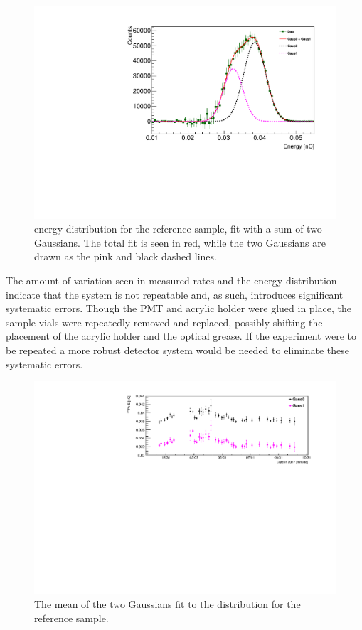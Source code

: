 \begin{figure}[!b]
	\centering
	\includegraphics[width=0.6\linewidth]{tex/6-ac227-images/BNL/PoEnFit_TimeBin23_S2}
	\caption[\Po energy distribution for reference sample with two Gaussian fit]{\Po energy distribution for the reference sample, fit with a sum of two Gaussians. The total fit is seen in red, while the two Gaussians are drawn as the pink and black dashed lines.}
	\label{fig:poenfittimebin23s2}
\end{figure}

The amount of variation seen in measured rates and the \Po energy distribution indicate that the system is not repeatable and, as such, introduces significant systematic errors. 
Though the PMT and acrylic holder were glued in place, the sample vials were repeatedly removed and replaced, possibly shifting the placement of the acrylic holder and the optical grease.
If the experiment were to be repeated a more robust detector system would be needed to eliminate these systematic errors.

\begin{figure}[!t]
	\centering
	\includegraphics[width=0.8\linewidth]{tex/6-ac227-images/BNL/PoEnMeanVsTime_S2}
	\caption[\Po mean versus time for the reference sample]{The mean of the two Gaussians fit to the \Po distribution for the reference sample.}
	\label{fig:poenmeanvstimes2}
\end{figure}

